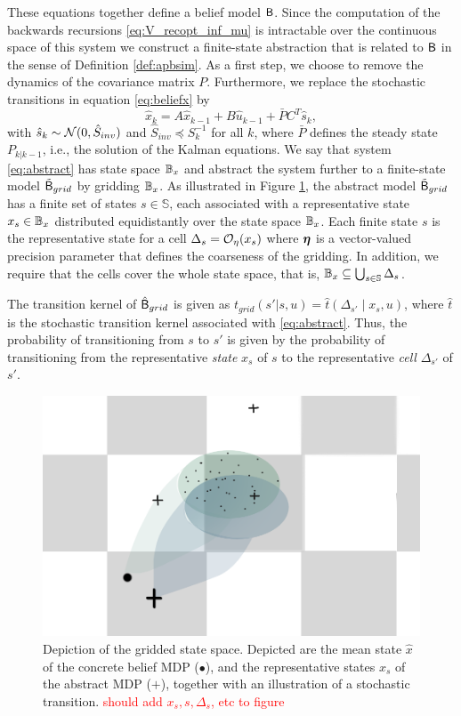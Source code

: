 \documentclass{ifacconf}
\begin{document}
These equations together define a belief model $\mathsf{B}$. Since the computation of the backwards recursions \eqref{eq:V_recopt_inf_mu} is intractable over the continuous space of this system we construct a finite-state abstraction that is related to $\mathsf{B}$ in the sense of Definition \ref{def:apbsim}. As a first step, we choose to remove the dynamics of the covariance matrix $P$. Furthermore, we replace the stochastic transitions in equation \eqref{eq:beliefx} by
\begin{equation}  
		\hat x_k  = A\hat x_{k-1} +B\hat u_{k-1} + \bar P  C^T  \hat{s}_k,\label{eq:abstract} 
\end{equation}
with $ \hat{s}_k\sim \mathcal{N} (0,\hat{S}_{inv})$ and $\hat{S}_{inv}\preceq S_k^{-1}$ for all $k$, where $\bar P$ defines the steady state $P_{k|k-1}$, i.e., the solution of the Kalman equations. We say that system \eqref{eq:abstract} has state space $\mathbb{B}_{x}$ and abstract the system further to a finite-state model $\tilde {\mathsf{B}}_{grid}$ by gridding $\mathbb{B}_x$. As illustrated in Figure \ref{fig:grid}, the abstract model $\tilde {\mathsf{B}}_{grid}$ has a finite set of states $s \in \mathbb{S}$, each associated with a representative state $x_s \in \mathbb{B}_x$ distributed equidistantly over the state space $\mathbb{B}_x$. Each finite state $s$ is the representative state for a cell $\Delta_{s}= \mathcal{O}_\eta(x_s)$ where ${\boldsymbol{\eta}}$ is a vector-valued precision parameter that defines the coarseness of the gridding. In addition, we require that the cells cover the whole state space, that is, $\mathbb{B}_x \subseteq \bigcup_{s \in \mathbb{S}} \Delta_{s}$.

The transition kernel of $\hat{\mathsf{B}}_{grid}$ is given as $t_{grid}(s'|s,u)=\hat t \left(\Delta_{s'}\mid x_s, u\right)$, where $\hat t$ is the stochastic transition kernel associated with \eqref{eq:abstract}. Thus, the probability of transitioning from $s$ to $s'$ is given by the probability of transitioning from the representative \emph{state} $x_s$ of $s$ to the representative \emph{cell} $\Delta_{s'}$ of $s'$.

\begin{figure}[htp]
\centering
	\includegraphics[width = .6\columnwidth]{figs/grid}
	\caption{Depiction of the gridded state space. Depicted are the mean state $\hat x$ of the concrete belief MDP ($\bullet$), and the representative states $x_s$ of the abstract MDP ($\boldsymbol{+}$), together with an illustration of a stochastic transition. \textcolor{red}{should add $x_s, s, \Delta_s$, etc to figure} } 
  \label{fig:grid}
\end{figure}
 
\end{document}
